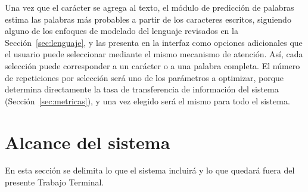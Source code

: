 Una vez que el carácter se agrega al texto, el módulo de predicción de palabras estima las
palabras más probables a partir de los caracteres escritos, siguiendo alguno de los enfoques de
modelado del lenguaje revisados en la Sección~\ref{sec:lenguaje}, y las presenta en la interfaz
como opciones adicionales que el usuario puede seleccionar mediante el mismo mecanismo de
atención. Así, cada selección puede corresponder a un carácter o a una palabra completa. El
número de repeticiones por selección será uno de los parámetros a optimizar, porque determina
directamente la tasa de transferencia de información del sistema (Sección~\ref{sec:metricas}),
y una vez elegido será el mismo para todo el sistema.

\section[ALCANCE DEL SISTEMA]{Alcance del sistema}
\label{sec:alcance}

En esta sección se delimita lo que el sistema incluirá y lo que quedará fuera del presente Trabajo
Terminal.

